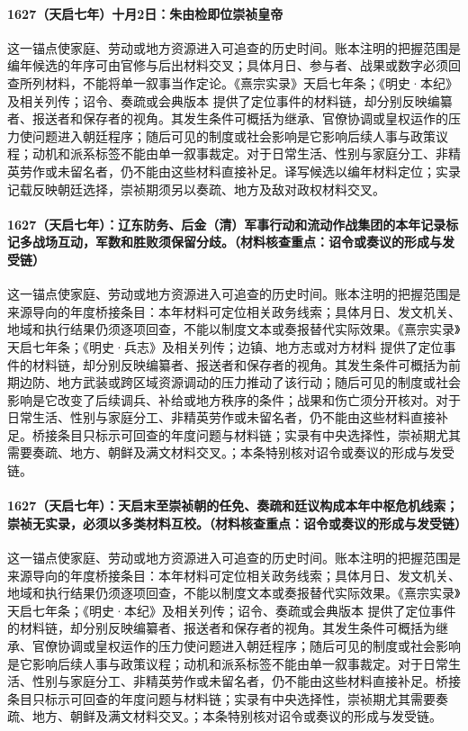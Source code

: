 \paragraph{1627（天启七年）十月2日：朱由检即位崇祯皇帝} 这一锚点使家庭、劳动或地方资源进入可追查的历史时间。账本注明的把握范围是编年候选的年序可由官修与后出材料交叉；具体月日、参与者、战果或数字必须回查所列材料，不能将单一叙事当作定论。《熹宗实录》天启七年条；《明史·本纪》及相关列传；诏令、奏疏或会典版本 提供了定位事件的材料链，却分别反映编纂者、报送者和保存者的视角。其发生条件可概括为继承、官僚协调或皇权运作的压力使问题进入朝廷程序；随后可见的制度或社会影响是它影响后续人事与政策议程；动机和派系标签不能由单一叙事裁定。对于日常生活、性别与家庭分工、非精英劳作或未留名者，仍不能由这些材料直接补足。译写候选以编年材料定位；实录记载反映朝廷选择，崇祯期须另以奏疏、地方及敌对政权材料交叉。

\paragraph{1627（天启七年）：辽东防务、后金（清）军事行动和流动作战集团的本年记录标记多战场互动，军数和胜败须保留分歧。（材料核查重点：诏令或奏议的形成与发受链）} 这一锚点使家庭、劳动或地方资源进入可追查的历史时间。账本注明的把握范围是来源导向的年度桥接条目：本年材料可定位相关政务线索；具体月日、发文机关、地域和执行结果仍须逐项回查，不能以制度文本或奏报替代实际效果。《熹宗实录》天启七年条；《明史·兵志》及相关列传；边镇、地方志或对方材料 提供了定位事件的材料链，却分别反映编纂者、报送者和保存者的视角。其发生条件可概括为前期边防、地方武装或跨区域资源调动的压力推动了该行动；随后可见的制度或社会影响是它改变了后续调兵、补给或地方秩序的条件；战果和伤亡须分开核对。对于日常生活、性别与家庭分工、非精英劳作或未留名者，仍不能由这些材料直接补足。桥接条目只标示可回查的年度问题与材料链；实录有中央选择性，崇祯期尤其需要奏疏、地方、朝鲜及满文材料交叉。；本条特别核对诏令或奏议的形成与发受链。

\paragraph{1627（天启七年）：天启末至崇祯朝的任免、奏疏和廷议构成本年中枢危机线索；崇祯无实录，必须以多类材料互校。（材料核查重点：诏令或奏议的形成与发受链）} 这一锚点使家庭、劳动或地方资源进入可追查的历史时间。账本注明的把握范围是来源导向的年度桥接条目：本年材料可定位相关政务线索；具体月日、发文机关、地域和执行结果仍须逐项回查，不能以制度文本或奏报替代实际效果。《熹宗实录》天启七年条；《明史·本纪》及相关列传；诏令、奏疏或会典版本 提供了定位事件的材料链，却分别反映编纂者、报送者和保存者的视角。其发生条件可概括为继承、官僚协调或皇权运作的压力使问题进入朝廷程序；随后可见的制度或社会影响是它影响后续人事与政策议程；动机和派系标签不能由单一叙事裁定。对于日常生活、性别与家庭分工、非精英劳作或未留名者，仍不能由这些材料直接补足。桥接条目只标示可回查的年度问题与材料链；实录有中央选择性，崇祯期尤其需要奏疏、地方、朝鲜及满文材料交叉。；本条特别核对诏令或奏议的形成与发受链。

